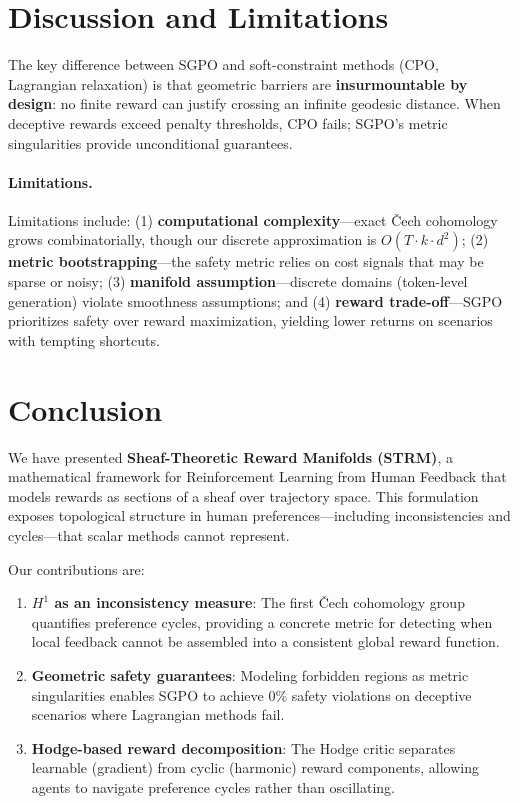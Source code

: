 \section{Discussion and Limitations}
\label{sec:discussion}

The key difference between SGPO and soft-constraint methods (CPO, Lagrangian relaxation) is that geometric barriers are \textbf{insurmountable by design}: no finite reward can justify crossing an infinite geodesic distance. When deceptive rewards exceed penalty thresholds, CPO fails; SGPO's metric singularities provide unconditional guarantees.

\paragraph{Limitations.}

Limitations include: (1) \textbf{computational complexity}---exact \v{C}ech cohomology grows combinatorially, though our discrete approximation is $O(T \cdot k \cdot d^2)$; (2) \textbf{metric bootstrapping}---the safety metric relies on cost signals that may be sparse or noisy; (3) \textbf{manifold assumption}---discrete domains (token-level generation) violate smoothness assumptions; and (4) \textbf{reward trade-off}---SGPO prioritizes safety over reward maximization, yielding lower returns on scenarios with tempting shortcuts.

\section{Conclusion}
\label{sec:conclusion}

We have presented \textbf{Sheaf-Theoretic Reward Manifolds (STRM)}, a mathematical framework for Reinforcement Learning from Human Feedback that models rewards as sections of a sheaf over trajectory space. This formulation exposes topological structure in human preferences---including inconsistencies and cycles---that scalar methods cannot represent.

Our contributions are:
\begin{enumerate}
    \item \textbf{$H^1$ as an inconsistency measure}: The first \v{C}ech cohomology group quantifies preference cycles, providing a concrete metric for detecting when local feedback cannot be assembled into a consistent global reward function.
    \item \textbf{Geometric safety guarantees}: Modeling forbidden regions as metric singularities enables SGPO to achieve 0\% safety violations on deceptive scenarios where Lagrangian methods fail.
    \item \textbf{Hodge-based reward decomposition}: The Hodge critic separates learnable (gradient) from cyclic (harmonic) reward components, allowing agents to navigate preference cycles rather than oscillating.
\end{enumerate}

